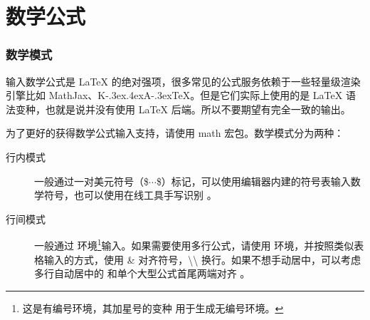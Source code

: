
\section{数学公式}

\begin{frame}
  \frametitle{数学模式}
  \begin{alertblock}{}
  输入数学公式是 \LaTeX{} 的绝对强项，很多常见的公式服务依赖于一些轻量级渲染引擎比如 MathJax、K\kern-.3ex\raise.4ex\hbox{\footnotesize A}\kern-.3ex\TeX{}。但是它们实际上使用的是 \LaTeX{} 语法变种，也就是说并没有使用 \LaTeX{} 后端。所以不要期望有完全一致的输出。
  \end{alertblock}

  为了更好的获得数学公式输入支持，请使用 math 宏包。数学模式分为两种：
  \begin{description}
    \item[行内模式] 一般通过一对美元符号（\$$\cdots$\$）标记，可以使用编辑器内建的符号表输入数学符号，也可以使用在线工具手写识别  。
    \item[行间模式] 一般通过  环境\footnote{这是有编号环境，其加星号的变种  用于生成无编号环境。}输入。如果需要使用多行公式，请使用  环境，并按照类似表格输入的方式，使用 \& 对齐符号，\textbackslash\textbackslash{} 换行。如果不想手动居中，可以考虑多行自动居中的  和单个大型公式首尾两端对齐 。
  \end{description}
\end{frame}

